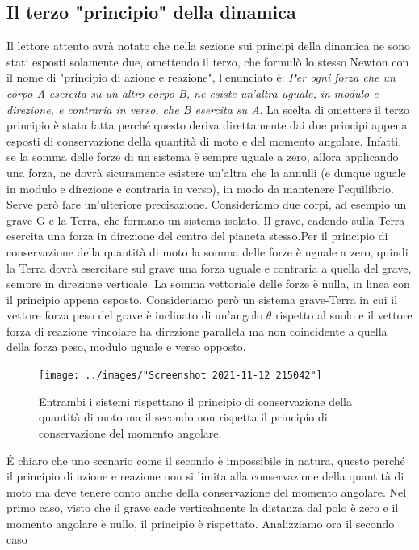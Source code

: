 \documentclass[10pt,a4paper]{article}
\begin{document}
\subsection{Il terzo "principio" della dinamica}
Il lettore attento avrà notato che nella sezione sui principi della dinamica ne sono stati esposti solamente due, omettendo il terzo, che formulò lo stesso Newton con il nome di "principio di azione e reazione", l'enunciato è: \textit{Per ogni forza che un corpo A esercita su un altro corpo B, ne esiste un'altra uguale, in modulo e direzione, e contraria in verso, che B esercita su A}. La scelta di omettere il terzo principio è stata fatta perché questo deriva direttamente dai due principi appena esposti di conservazione della quantità di moto e del momento angolare. Infatti, se la somma delle forze di un sistema è sempre uguale a zero, allora applicando una forza, ne dovrà sicuramente esistere un'altra che la annulli (e dunque uguale in modulo e direzione e contraria in verso), in modo da mantenere l'equilibrio. Serve però fare un'ulteriore precisazione. Consideriamo due corpi, ad esempio un grave G e la Terra, che formano un sistema isolato. Il grave, cadendo sulla Terra esercita una forza in direzione del centro del pianeta stesso.Per il principio di conservazione della quantità di moto la somma delle forze è uguale a zero, quindi la Terra dovrà esercitare sul grave una forza uguale e contraria a quella del grave, sempre in direzione verticale. La somma vettoriale delle forze è nulla, in linea con il principio appena esposto. Consideriamo però un sistema grave-Terra in cui il vettore forza peso del grave è inclinato di un'angolo $\theta$ rispetto al suolo e il vettore forza di reazione vincolare ha direzione parallela ma non coincidente a quella della forza peso, modulo uguale e verso opposto.
\begin{figure}[h]
	\centering
	\texttt{[image: ../images/"Screenshot 2021-11-12 215042"]}
	\caption{Entrambi i sistemi rispettano il principio di conservazione della quantità di moto ma il secondo non rispetta il principio di conservazione del momento angolare.}
	\label{fig:screenshot-2021-11-12-215042}
\end{figure}\FloatBarrier
\'{E} chiaro che uno scenario come il secondo è impossibile in natura, questo perché il principio di azione e reazione non si limita alla conservazione della quantità di moto ma deve tenere conto anche della conservazione del momento angolare. Nel primo caso, visto che il grave cade verticalmente la distanza dal polo è zero e il momento angolare è nullo, il principio è rispettato. Analizziamo ora il secondo caso
\end{document}

